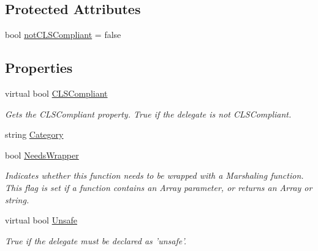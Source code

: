 \subsection*{Protected Attributes}
\begin{DoxyCompactItemize}
\item 
bool \hyperlink{class_bind_1_1_structures_1_1_delegate_af6d271c2e4161a6ea3061be6cfe17fcd}{notCLSCompliant} = false
\end{DoxyCompactItemize}
\subsection*{Properties}
\begin{DoxyCompactItemize}
\item 
virtual bool \hyperlink{class_bind_1_1_structures_1_1_delegate_abf52ade2013e0401d4dc77df85f95085}{CLSCompliant}
\begin{DoxyCompactList}\small\item\em Gets the CLSCompliant property. True if the delegate is not CLSCompliant. \item\end{DoxyCompactList}\item 
string \hyperlink{class_bind_1_1_structures_1_1_delegate_a67d00dcb5bc415e28a4d4c6f48ae57a3}{Category}
\item 
bool \hyperlink{class_bind_1_1_structures_1_1_delegate_aac54ac6f4d2ad31102396305cef03412}{NeedsWrapper}
\begin{DoxyCompactList}\small\item\em Indicates whether this function needs to be wrapped with a Marshaling function. This flag is set if a function contains an Array parameter, or returns an Array or string. \item\end{DoxyCompactList}\item 
virtual bool \hyperlink{class_bind_1_1_structures_1_1_delegate_aae33530792e1146d9cd50363f7759da9}{Unsafe}
\begin{DoxyCompactList}\small\item\em True if the delegate must be declared as 'unsafe'. \item\end{DoxyCompactList}\item 

\end{DoxyCompactItemize}
